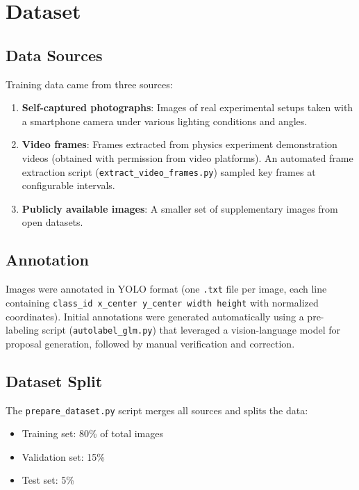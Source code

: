 \documentclass[12pt]{article}
\begin{document}
\section{Dataset}

\subsection{Data Sources}

Training data came from three sources:
\begin{enumerate}[noitemsep]
  \item \textbf{Self-captured photographs}: Images of real experimental setups taken with a smartphone camera under various lighting conditions and angles.
  \item \textbf{Video frames}: Frames extracted from physics experiment demonstration videos (obtained with permission from video platforms). An automated frame extraction script (\texttt{extract\_video\_frames.py}) sampled key frames at configurable intervals.
  \item \textbf{Publicly available images}: A smaller set of supplementary images from open datasets.
\end{enumerate}

\subsection{Annotation}

Images were annotated in YOLO format (one \texttt{.txt} file per image, each line containing \texttt{class\_id x\_center y\_center width height} with normalized coordinates). Initial annotations were generated automatically using a pre-labeling script (\texttt{autolabel\_glm.py}) that leveraged a vision-language model for proposal generation, followed by manual verification and correction.

\subsection{Dataset Split}

The \texttt{prepare\_dataset.py} script merges all sources and splits the data:
\begin{itemize}[noitemsep]
  \item Training set: 80\% of total images
  \item Validation set: 15\%
  \item Test set: 5\%
\end{itemize}
\end{document}
